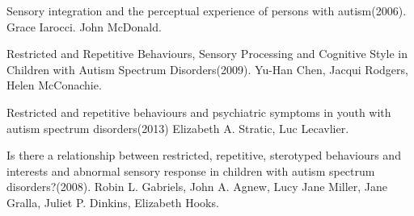 \documentclass[11pt]{report}
\begin{document}
\begin{thebibliography}{9}
Sensory integration and the perceptual experience of persons with autism(2006). Grace Iarocci. John McDonald.

Restricted and Repetitive Behaviours, Sensory Processing and Cognitive Style in Children with Autism Spectrum Disorders(2009). Yu-Han Chen, Jacqui Rodgers, Helen McConachie.

Restricted and repetitive behaviours and psychiatric symptoms in youth with autism spectrum disorders(2013) Elizabeth A. Stratic, Luc Lecavlier.

Is there a relationship between restricted, repetitive, sterotyped behaviours and interests and abnormal sensory response in children with autism spectrum disorders?(2008). Robin L. Gabriels, John A. Agnew, Lucy Jane Miller, Jane Gralla, Juliet P. Dinkins, Elizabeth Hooks.


\end{thebibliography}
\end{document}
